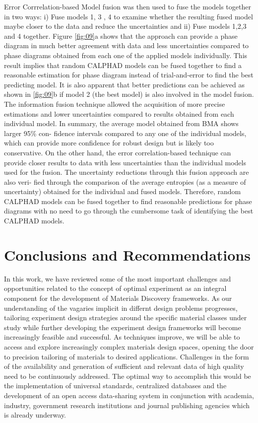 \documentclass[utf8]{frontiersSCNS} %
\begin{document}
Error Corrrelation-based Model fusion was then used to fuse the models together in two ways: i) Fuse models 1, 3 , 4 to examine whether the resulting fused model maybe closer to the data and reduce the uncertainties and ii) Fuse models 1,2,3 and 4 together. Figure \ref{fig:09}a  shows that the approach can provide a phase diagram in much better agreement with data and less uncertainties compared to phase diagrams obtained from each one of the applied models individually. This result implies that random CALPHAD models can be fused together to find a reasonable estimation for phase diagram instead of trial-and-error to find the best predicting model. It is also apparent that better predictions can be achieved as shown in \ref{fig:09}b if model 2 (the best model) is also involved in the model fusion. The information fusion technique allowed the acquisition of more precise estimations and lower uncertainties compared to results obtained from each individual model. 
In summary, the average model obtained from BMA shows larger 95\% con- fidence intervals compared to any one of the individual models, which can provide more confidence for robust design but is likely too conservative. On the other hand, the error correlation-based technique can provide closer results to data with less uncertainties than the individual models used for the fusion. The uncertainty reductions through this fusion approach are also veri- fied through the comparison of the average entropies (as a measure of uncertainty) obtained for the individual and fused models. Therefore, random CALPHAD models can be fused together to find reasonable predictions for phase diagrams with no need to go through the cumbersome task of identifying the best CALPHAD models.

\section{Conclusions and Recommendations}
In this work, we have reviewed some of the most important challenges and opportunities related to the concept of optimal experiment  as an integral component for the development of Materials Discovery frameworks. As our understanding of the vagaries implicit in differnt design problems progresses, tailoring experiment design strategies around the specific material classes under study while further developing the experiment design frameworks will become increasingly feasible and successful. As techniques improve, we will be able to access and explore increasingly complex materials design spaces, opening the door to precision tailoring of materials to desired applications. Challenges in the form of the availability and generation of sufficient and relevant data of high quality need to be continuously addressed. The optimal way to accomplish this would be the implementation of universal standards, centralized databases and the development of an open access data-sharing system in conjunction with academia, industry, government research institutions and journal publishing agencies which is already underway.  
\end{document}
